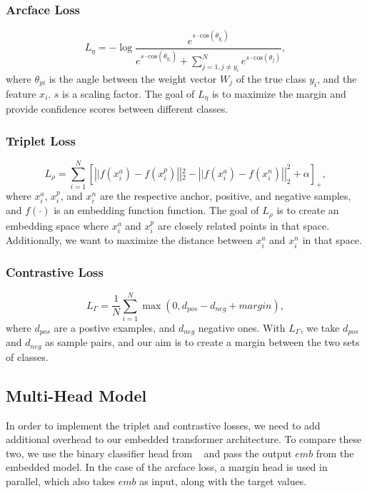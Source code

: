 \documentclass[10pt,twocolumn,letterpaper]{article}
\begin{document}
\subsubsection{Arcface Loss}
\begin{equation}
L_\eta = -\log \frac{e^{s\cdot \text{cos}(\theta_{y_i})}}{e^{s\cdot \text{cos}(\theta_{y_i})} + \sum_{j=1, j\neq y_i}^N e^{s\cdot \text{cos}(\theta_j)}},
\end{equation}
where $\theta_{yi}$ is the angle between the weight vector $W_j$ of the true class $y_i$, and the feature $x_i$. $s$ is a scaling factor. The goal of $L_\eta$ is to maximize 
the margin and provide confidence scores between different classes. 
\subsubsection{Triplet Loss}
\begin{equation}
    L_\rho = \sum_{i=1}^{N}\left[\left||f\left(x_{i}^{a}\right)-f\left(x_{i}^{p}\right)\right||_{2}^{2}-\left||f\left(x_{i}^{a}\right)-f\left(x_{i}^{n}\right)\right||_{2}^{2}+\alpha\right]_{+},
\end{equation}
where $x_i^a$, $x_i^p$, and $x_i^n$ are the respective anchor, positive, and negative samples, and $f(\cdot)$ is an embedding function function. The goal of $L_\rho$ is to create an embedding space where $x_i^a$ and $x_i^p$ are closely related points in that space. Additionally, 
we want to maximize the distance between $x_i^a$ and $x_i^n$ in that space.
\subsubsection{Contrastive Loss}
\begin{equation}
L_\Gamma = \frac{1}{N} \sum_{i=1}^N \max(0, d_{pos} - d_{neg} + margin),
\end{equation}
where $d_{pos}$ are a postive examples, and $d_{neg}$ negative ones. With $L_\Gamma$, we take $d_{pos}$ and $d_{neg}$ as sample pairs, and our aim is to create a margin between the two sets of classes.
\subsection{Multi-Head Model}
In order to implement the triplet and contrastive losses, we need to add additional overhead to our embedded transformer architecture. 
To compare these two, we use the binary classifier head from ~\cite{repo} and pass the output $emb$ from the embedded model.  In the case of the arcface loss, a margin head is used in parallel, which also takes $emb$ as input, along with the target values.
\end{document}
